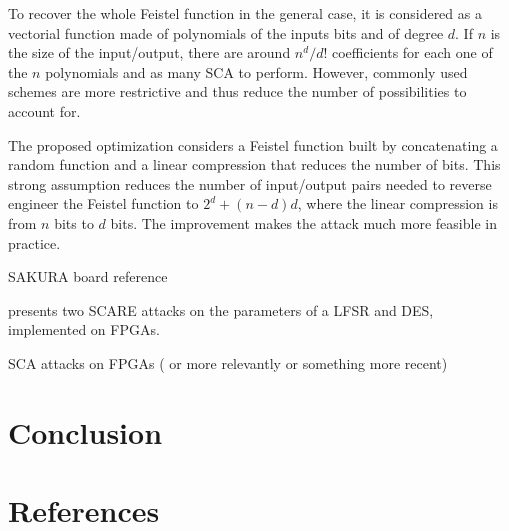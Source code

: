 \documentclass[11pt]{sdm}
\begin{document}
To recover the whole Feistel function in the general case, it is considered as a vectorial function made of polynomials of the inputs bits and of degree $d$.
If $n$ is the size of the input/output, there are around $n^d/d!$ coefficients for each one of the $n$ polynomials and as many SCA to perform.
However, commonly used schemes are more restrictive and thus reduce the number of possibilities to account for.

The proposed optimization considers a Feistel function built by concatenating a random function and a linear compression that reduces the number of bits.
This strong assumption reduces the number of input/output pairs needed to reverse engineer the Feistel function to $2^d + (n-d)d$, where the linear compression is from $n$ bits to $d$ bits.
The improvement makes the attack much more feasible in practice. 


SAKURA board reference

\parencite{Guilley_Sauvage_Micolod_Réal_Valette_2010} presents two SCARE attacks on the parameters of a LFSR and DES, implemented on FPGAs.

SCA attacks on FPGAs (\parencite{Peeters_Standaert_Donckers_Quisquater_2005} or more relevantly \parencite{Standaert_Ors_Preneel_2004} or something more recent)


\section{Conclusion}

\section*{References}

\printbibliography
\end{document}
